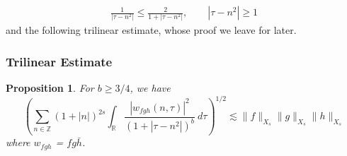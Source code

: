 \documentclass[handout]{beamer}
\numberwithin{equation}{section}
\newcommand{\rr}{\mathbb{R}}
\newcommand{\zz}{\mathbb{Z}}
\newcommand{\wh}{\widehat}
\newtheorem{proposition}{Proposition}
\begin{document}
%
\begin{frame}
\begin{equation}
	\label{one-plus-ineq}
	\begin{split}
		\frac{1}{|\tau - n^{2}| } \le \frac{2}{1 + |\tau - n^{2}| }, 
		\qquad |\tau - n^{2}| \ge 1
	\end{split}
\end{equation}
%
%
and the following trilinear estimate, whose proof we leave for later.

\end{frame}


\begin{frame}
%
%
%
%
%
%
%
\subsubsection{Trilinear Estimate}
%
\begin{proposition}
	\label{prop:trilinear-est}
	For $b \ge 3/4$, we have
	\begin{equation}
		\left( \sum_{n \in \zz} \left(1 + |n| \right)^{2s} \int_\rr
		\frac{|\wh{w_{fgh}}(n, \tau) |^2}{\left (1+ |\tau - 
		n^{2}| \right ) ^b} 
		 \ d \tau 
		\right)^{1/2}
		\lesssim \|f\|_{X_s} \|g\|_{X_s}\|h\|_{X_s}
	\end{equation}
	where $w_{fgh}$ = $fg \bar h$.
%
%
%
%
\end{proposition}


\end{frame}
%
%
%
\end{document}
